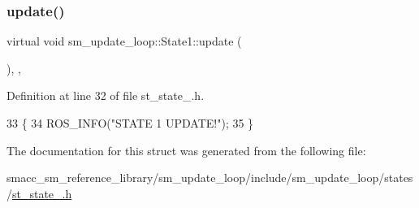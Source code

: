 \subsubsection{\texorpdfstring{update()}{update()}}
{\footnotesize\ttfamily virtual void sm\+\_\+update\+\_\+loop\+::\+State1\+::update (\begin{DoxyParamCaption}{ }\end{DoxyParamCaption})\hspace{0.3cm}{\ttfamily [inline]}, {\ttfamily [override]}, {\ttfamily [virtual]}}



Definition at line 32 of file st\+\_\+state\+\_.\+h.


\begin{DoxyCode}
33     \{
34         ROS\_INFO(\textcolor{stringliteral}{"STATE 1 UPDATE!"});
35     \}
\end{DoxyCode}


The documentation for this struct was generated from the following file\+:\begin{DoxyCompactItemize}
\item 
smacc\+\_\+sm\+\_\+reference\+\_\+library/sm\+\_\+update\+\_\+loop/include/sm\+\_\+update\+\_\+loop/states/\hyperlink{sm__update__loop_2include_2sm__update__loop_2states_2st__state__1_8h}{st\+\_\+state\+\_.\+h}\end{DoxyCompactItemize}
